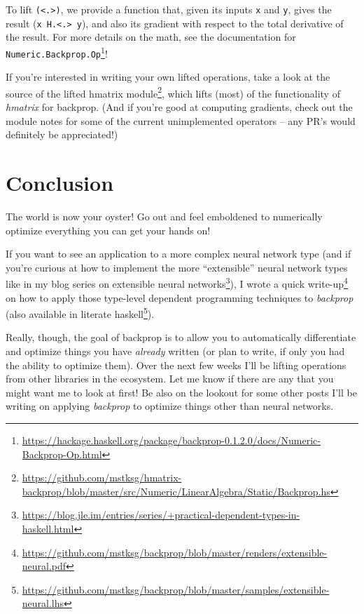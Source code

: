 \documentclass[]{article}
\renewcommand{\href}[2]{#2\footnote{\url{#1}}}
\begin{document}
To lift \texttt{(\textless{}.\textgreater{})}, we provide a function that, given
its inputs \texttt{x} and \texttt{y}, gives the result
(\texttt{x\ H.\textless{}.\textgreater{}\ y}), and also its gradient with
respect to the total derivative of the result. For more details on the math, see
the
\href{https://hackage.haskell.org/package/backprop-0.1.2.0/docs/Numeric-Backprop-Op.html}{documentation
for \texttt{Numeric.Backprop.Op}}!

If you're interested in writing your own lifted operations, take a look at the
\href{https://github.com/mstksg/hmatrix-backprop/blob/master/src/Numeric/LinearAlgebra/Static/Backprop.hs}{source
of the lifted hmatrix module}, which lifts (most) of the functionality of
\emph{hmatrix} for backprop. (And if you're good at computing gradients, check
out the module notes for some of the current unimplemented operators -- any PR's
would definitely be appreciated!)

\hypertarget{conclusion}{%
\section{Conclusion}\label{conclusion}}

The world is now your oyster! Go out and feel emboldened to numerically optimize
everything you can get your hands on!

If you want to see an application to a more complex neural network type (and if
you're curious at how to implement the more ``extensible'' neural network types
like in my
\href{https://blog.jle.im/entries/series/+practical-dependent-types-in-haskell.html}{blog
series on extensible neural networks}), I wrote
\href{https://github.com/mstksg/backprop/blob/master/renders/extensible-neural.pdf}{a
quick write-up} on how to apply those type-level dependent programming
techniques to \emph{backprop} (also available in
\href{https://github.com/mstksg/backprop/blob/master/samples/extensible-neural.lhs}{literate
haskell}).

Really, though, the goal of backprop is to allow you to automatically
differentiate and optimize things you have \emph{already} written (or plan to
write, if only you had the ability to optimize them). Over the next few weeks
I'll be lifting operations from other libraries in the ecosystem. Let me know if
there are any that you might want me to look at first! Be also on the lookout
for some other posts I'll be writing on applying \emph{backprop} to optimize
things other than neural networks.
\end{document}

